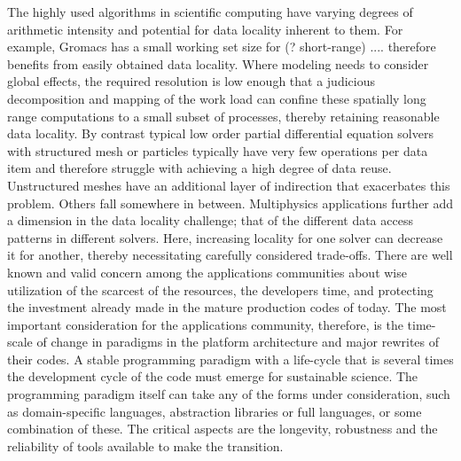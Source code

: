 The highly used algorithms in scientific computing have varying
degrees of arithmetic intensity and potential for data locality
inherent to them. For example, Gromacs has a small working set size
for (? short-range) .... therefore benefits from easily obtained data
locality. Where modeling needs to consider global effects, the
required resolution is low enough that a judicious decomposition and
mapping of the work load can confine these spatially long range
computations to a small subset of processes, thereby retaining 
reasonable data locality. By contrast typical low order partial
differential equation solvers with structured mesh or particles
typically have very few operations per data item and therefore
struggle with achieving a high degree of data reuse. Unstructured
meshes have an additional layer of indirection that exacerbates this
problem.  Others fall somewhere in between. Multiphysics applications
further add a dimension  in  the data locality challenge; that of the
different data access patterns in different solvers. Here, increasing
locality for one solver can decrease it for another, thereby
necessitating carefully considered trade-offs. There are well known
and valid concern among the applications communities about wise
utilization of the scarcest of the resources, the developers time, and
protecting the investment already made in the mature production codes
of today. The most important consideration for the applications
community, therefore, is the time-scale of change in paradigms in the
platform architecture and major rewrites of their codes. A stable
programming paradigm with a life-cycle that is several times the
development cycle of the code must emerge for sustainable science. The
programming paradigm itself can take any of the forms under
consideration, such as domain-specific languages, abstraction
libraries or full languages, or some combination of these.  The
critical aspects are the longevity, robustness and the reliability of
tools available to make the transition. 
 
